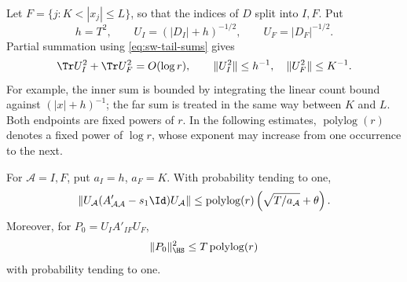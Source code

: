 Let \(F=\{j:K<|x_j|\le L\}\), so that the indices of \(D\) split into \(I,F\).
Put
\begin{equation}\label{eq:sw-weights}
 h=T^2,\qquad U_I=(|D_I|+h)^{-1/2},\qquad
 U_F=|D_F|^{-1/2}.
\end{equation}
Partial summation using \eqref{eq:sw-tail-sums} gives
\begin{equation}\label{eq:sw-weight-bounds}
 \Tr U_I^2+\Tr U_F^2=O(\log r),\qquad
 \|U_I^2\|\le h^{-1},\quad \|U_F^2\|\le K^{-1}.
\end{equation}
For example, the inner sum is bounded by integrating the linear count
bound against \((|x|+h)^{-1}\); the far sum is treated in the same way
between \(K\) and \(L\). Both endpoints are fixed powers of \(r\).
In the following estimates, \(\operatorname{polylog}(r)\) denotes a fixed
power of \(\log r\), whose exponent may increase from one occurrence
to the next.

\begin{lemma}\label{sw:weighted-blocks}
For \(\mathcal A=I,F\), put \(a_I=h\), \(a_F=K\). With probability tending
to one,
\begin{equation}\label{eq:sw-bernstein}
 \left\|U_{\mathcal A}
       (A'_{\mathcal A\mathcal A}-s_1\Id)
       U_{\mathcal A}\right\|
 \le \operatorname{polylog}(r)
       \left(\sqrt{T/a_{\mathcal A}}+\theta\right).
\end{equation}
Moreover, for \(P_0=U_IA'_{IF}U_F\),
\begin{equation}\label{eq:sw-cross-block}
 \|P_0\|_{\HS}^2\le T\operatorname{polylog}(r)
\end{equation}
with probability tending to one.
\end{lemma}


